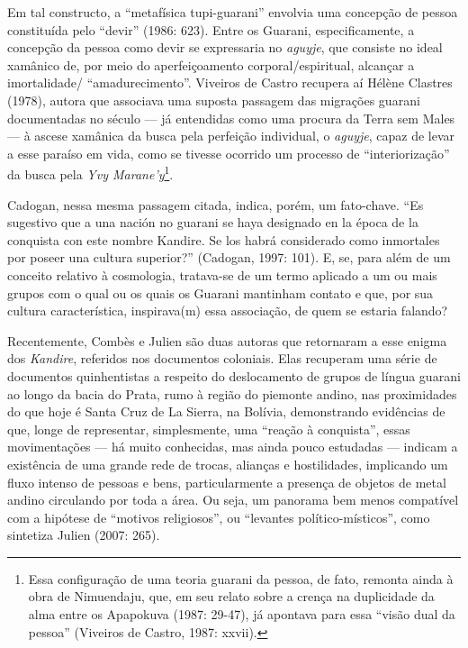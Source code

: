 Em tal constructo, a ``metafísica tupi-guarani'' envolvia uma concepção de
pessoa constituída pelo ``devir'' (1986: 623). Entre os Guarani,
especificamente, a concepção da pessoa como devir se expressaria no
\emph{aguyje}, que consiste no ideal xamânico de, por meio do aperfeiçoamento
corporal/espiritual, alcançar a imortalidade/ ``amadurecimento''.
Viveiros de Castro recupera aí Hélène Clastres (1978), autora que
associava uma suposta passagem das migrações guarani documentadas no
século  --- já entendidas como uma procura da Terra sem Males --- à
ascese xamânica da busca pela perfeição individual, o \emph{aguyje}, capaz de
levar a esse paraíso em vida, como se tivesse ocorrido um processo de
``interiorização'' da busca pela \emph{Yvy Marane’y}\footnote{Essa configuração
de uma teoria guarani da pessoa, de fato, remonta ainda à obra de
Nimuendaju, que, em seu relato sobre a crença na duplicidade da alma
entre os Apapokuva (1987: 29-47), já apontava para essa ``visão dual da
pessoa'' (Viveiros de Castro, 1987: xxvii).}.

Cadogan, nessa mesma passagem citada, indica, porém, um fato-chave. ``Es
sugestivo que a una nación no guarani se haya designado en la época de
la conquista con este nombre Kandire. Se los habrá considerado como
inmortales por poseer una cultura superior?'' (Cadogan, 1997: 101). E,
se, para além de um conceito relativo à cosmologia, tratava-se de um
termo aplicado a um ou mais grupos com o qual ou os quais os Guarani
mantinham contato e que, por sua cultura característica, inspirava(m)
essa associação, de quem se estaria falando?

Recentemente, Combès e Julien são duas autoras que retornaram a esse
enigma dos \emph{Kandire}, referidos nos documentos coloniais. Elas recuperam
uma série de documentos quinhentistas a respeito do deslocamento de
grupos de língua guarani ao longo da bacia do Prata, rumo à região do
piemonte andino, nas proximidades do que hoje é Santa Cruz de La
Sierra, na Bolívia, demonstrando evidências de que, longe de
representar, simplesmente, uma ``reação à conquista'', essas
movimentações --- há muito conhecidas, mas ainda pouco estudadas ---
indicam a existência de uma grande rede de trocas, alianças e
hostilidades, implicando um fluxo intenso de pessoas e bens,
particularmente a presença de objetos de metal andino circulando por
toda a área. Ou seja, um panorama bem menos compatível com a hipótese
de ``motivos religiosos'', ou ``levantes político-místicos'', como
sintetiza Julien (2007: 265).

